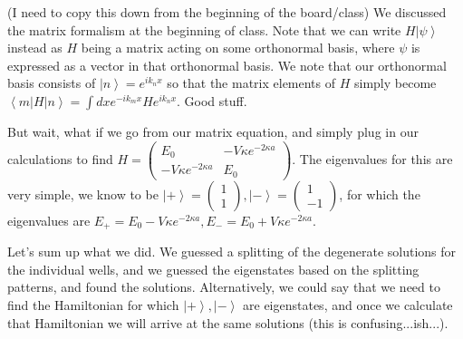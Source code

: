 \documentclass{report}
\begin{document}
(I need to copy this down from the beginning of the board/class) We discussed the matrix formalism at the beginning of class. Note that we can write $H\left|\psi\right>$ instead as $H$ being a matrix acting on some orthonormal basis, where $\psi$ is expressed as a vector in that orthonormal basis. We note that our orthonormal basis consists of $\left|n\right> = e^{ik_nx}$ so that the matrix elements of $H$ simply become $\left<m|H|n\right> = \int dx e^{-ik_mx}He^{ik_nx}$. Good stuff.

But wait, what if we go from our matrix equation, and simply plug in our calculations to find $H = \begin{pmatrix}E_0&-V\kappa e^{-2\kappa a}\\-V\kappa e^{-2\kappa a}& E_0\end{pmatrix}$. The eigenvalues for this are very simple, we know to be $\left|+\right> = \begin{pmatrix}1\\1\end{pmatrix},\left|-\right> = \begin{pmatrix}1\\ -1\end{pmatrix}$, for which the eigenvalues are $E_+ = E_0 - V\kappa e^{-2\kappa a}, E_- = E_0 + V\kappa e^{-2\kappa a}$. 

Let's sum up what we did. We guessed a splitting of the degenerate solutions for the individual wells, and we guessed the eigenstates based on the splitting patterns, and found the solutions. Alternatively, we could say that we need to find the Hamiltonian for which $\left|+\right>,\left|-\right>$ are eigenstates, and once we calculate that Hamiltonian we will arrive at the same solutions (this is confusing...ish...).
\end{document}

